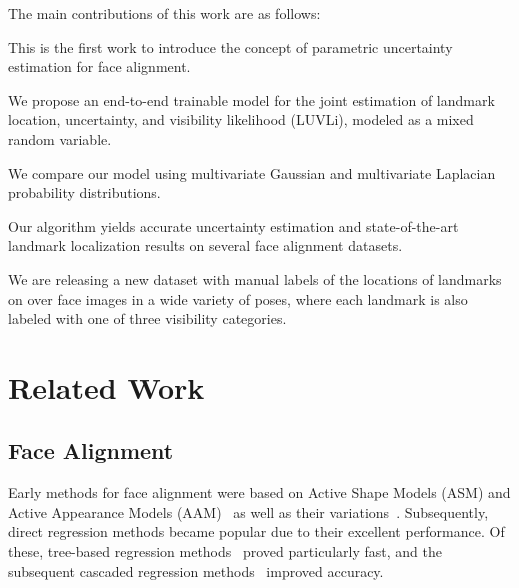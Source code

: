\documentclass[10pt,twocolumn,letterpaper]{article}
\newcommand{\1}{{\bf 1}}
\newcommand{\0}{{\bf 0}}
\begin{document}
    The main contributions of this work are as follows:
    \begin{compactitem}
        \item This is the first work to introduce the concept of parametric uncertainty estimation for face alignment.
        \item We propose an end-to-end trainable model for the joint estimation of landmark location, uncertainty, and visibility likelihood (LUVLi), modeled as a mixed random variable.
        \item We compare our model using multivariate Gaussian and multivariate Laplacian probability distributions. 
        \item Our algorithm yields accurate uncertainty estimation and state-of-the-art landmark localization results on several face alignment datasets.
        \item We are releasing a new dataset with manual labels of the locations of  landmarks on over  face images in a wide variety of poses, where each landmark is also labeled with one of three visibility categories.
    \end{compactitem}



\section{Related Work}
\subsection{Face Alignment}
\vspace{-0.15cm}

    Early methods for face alignment were based on Active Shape Models (ASM) and Active Appearance Models (AAM)~\cite{cootes1995active, cootes2001active,sauer2011accurate,sung2009adaptive,tzimiropolous2013aam} as well as their  variations~\cite{romdhani1999multiview,cootes2002viewAAM,Asthana2011ICCV3DposeNorm,hu2004multicamAAM, liu2008discriminative,liu2010video}. Subsequently, direct regression methods became popular due to their excellent performance. Of these, tree-based regression methods~\cite{ren2014face,kazemi2014one,cao2014face,cootes2012robust,tuzel2008learning} proved particularly fast, and the subsequent cascaded regression methods~\cite{dollar2010cascaded,xiong2013supervised,asthana2014incremental,tzimiropoulos2015POCR,tuzel2016robust} improved accuracy.
    
\end{document}
